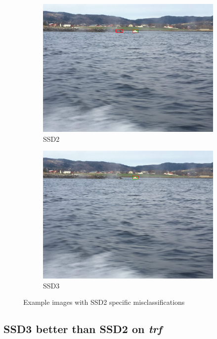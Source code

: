 \begin{figure}[h!]
\begin{subfigure}{.5\textwidth}
  \centering
  \includegraphics[width=0.75\linewidth]{results/case_buildings/ssdtrf/ssd2/grov2/IMG_2421.jpg}
  \caption{SSD2}
\end{subfigure}%
\begin{subfigure}{.5\textwidth}
  \centering
  \includegraphics[width=.75\linewidth]{results/case_buildings/ssdtrf/ssd3/grov2/IMG_2421.jpg}
  \caption{SSD3}
\end{subfigure}
\caption{Example images with SSD2 specific misclassifications}
\label{img:ssd_trf_grov2}
\end{figure}

\newpage

\subsection{SSD3 better than SSD2 on \textit{trf}}
\label{sec_ssd3_better_trf}

